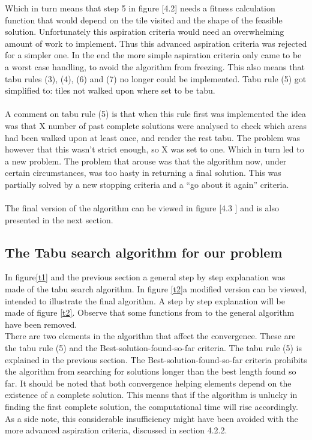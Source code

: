 Which in turn means that step 5 in figure [4.2] needs a fitness calculation function that would depend on the tile visited and the shape of the feasible solution. Unfortunately this aspiration criteria would need an overwhelming amount of work to implement. Thus this advanced aspiration criteria was rejected for a simpler one. In the end the more simple aspiration criteria only came to be a worst case handling, to avoid the algorithm from freezing. This also means that tabu rules (3), (4), (6) and (7) no longer could be implemented. Tabu rule (5) got simplified to: tiles not walked upon where set to be tabu.\\
\\A comment on tabu rule (5) is that when this rule first was implemented the idea was that X number of past complete solutions were analysed to check which areas had been walked upon at least once, and render the rest tabu. The problem was however that this wasn't strict enough, so X was set to one. Which in turn led to a new problem. The problem that arouse was that the algorithm now, under certain circumstances, was too hasty in returning a final solution. This was partially solved by a new stopping criteria and a ``go about it again'' criteria.\\
\\The final version of the algorithm can be viewed in figure [4.3 ] and is also presented in the next section.
\subsection{The Tabu search algorithm for our problem}
In figure\ref{t1} and the previous section a general step by step explanation was made of the tabu search algorithm. In figure \ref{t2}a modified version can be viewed, intended to illustrate the final algorithm. A step by step explanation will be made of figure \ref{t2}. Observe that some functions from to the general algorithm have been removed.\\

There are two elements in the algorithm that affect the convergence. These are the tabu rule (5) and the Best-solution-found-so-far criteria. The tabu rule (5) is explained in the previous section. The Best-solution-found-so-far criteria prohibits the algorithm from searching for solutions longer than the best length found so far. It should be noted that both convergence helping elements depend on the existence of a complete solution. This means that if the algorithm is unlucky in finding the first complete solution, the computational time will rise accordingly. As a side note, this considerable insufficiency might have been avoided with the more advanced aspiration criteria, discussed in section 4.2.2.

